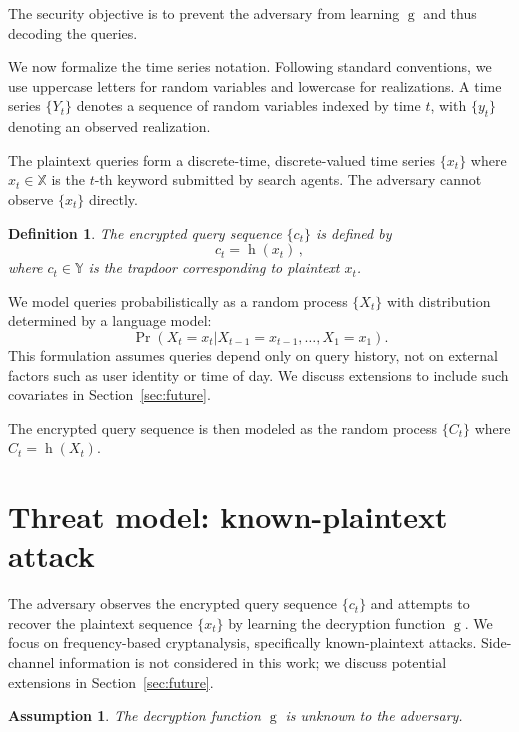 \documentclass[final,11pt]{article}
\newcommand{\set}[1]{\mathbb{#1}}
\theoremstyle{plain}
\newtheorem{definition}{Definition}
\newtheorem{assumption}{Assumption}
\theoremstyle{remark}
\begin{document}
The security objective is to prevent the adversary from learning
$\operatorname{g}$ and thus decoding the queries.

We now formalize the time series notation. Following standard conventions,
we use uppercase letters for random variables and lowercase for realizations.
A time series $\{Y_t\}$ denotes a sequence of random variables indexed by
time $t$, with $\{y_t\}$ denoting an observed realization.

The plaintext queries form a discrete-time, discrete-valued time series
$\{x_t\}$ where $x_t \in \set{X}$ is the $t$-th keyword submitted by search
agents. The adversary cannot observe $\{x_t\}$ directly.

\begin{definition}
The encrypted query sequence $\{c_t\}$ is defined by
$$
  c_t = \operatorname{h}(x_t)\,,
$$
where $c_t \in \set{Y}$ is the trapdoor corresponding to plaintext $x_t$.
\end{definition}

We model queries probabilistically as a random process $\{X_t\}$ with
distribution determined by a language model:
\begin{equation}
    \Pr(X_t = x_t | X_{t-1} = x_{t-1},\ldots,X_1 = x_1).
\end{equation}
This formulation assumes queries depend only on query history, not on
external factors such as user identity or time of day. We discuss
extensions to include such covariates in Section~\ref{sec:future}.

The encrypted query sequence is then modeled as the random process
$\{C_t\}$ where $C_t = \operatorname{h}(X_t)$.

\hypertarget{threat-model-known-plaintext-attack}{%
\section{Threat model: known-plaintext
attack}\label{threat-model-known-plaintext-attack}}

\label{sec:threat} The adversary observes the encrypted query sequence
$\{c_t\}$ and attempts to recover the plaintext sequence $\{x_t\}$ by
learning the decryption function $\operatorname{g}$. We focus on
frequency-based cryptanalysis, specifically known-plaintext attacks.
Side-channel information is not considered in this work; we discuss
potential extensions in Section~\ref{sec:future}.

\begin{assumption}
The decryption function $\operatorname{g}$ is unknown to the adversary.
\end{assumption}
\end{document}
